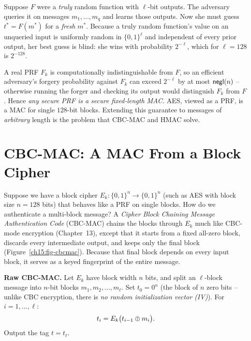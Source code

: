 \begin{whybox}
Suppose $F$ were a \emph{truly} random function with $\ell$-bit outputs. The adversary queries it on messages $m_1,\dots,m_q$ and learns those outputs. Now she must guess $t^* = F(m^*)$ for a \emph{fresh} $m^*$. Because a truly random function's value on an unqueried input is uniformly random in $\{0,1\}^\ell$ and independent of every prior output, her best guess is blind: she wins with probability $2^{-\ell}$, which for $\ell = 128$ is $2^{-128}$.

A real PRF $F_k$ is computationally indistinguishable from $F$, so an efficient adversary's forgery probability against $F_k$ can exceed $2^{-\ell}$ by at most $\mathsf{negl}(n)$ -- otherwise running the forger and checking its output would distinguish $F_k$ from $F$. Hence \emph{any secure PRF is a secure fixed-length MAC.} AES, viewed as a PRF, is a MAC for single $128$-bit blocks. Extending this guarantee to messages of \emph{arbitrary} length is the problem that CBC-MAC and HMAC solve.
\end{whybox}

\section{CBC-MAC: A MAC From a Block Cipher}
\label{ch15:cbc-mac}

Suppose we have a block cipher $E_k : \{0,1\}^n \to \{0,1\}^n$ (such as AES with block size $n = 128$ bits) that behaves like a PRF on single blocks. How do we authenticate a multi-block message? A \emph{Cipher Block Chaining Message Authentication Code} (CBC-MAC) chains the blocks through $E_k$ much like CBC-mode encryption (Chapter~13), except that it starts from a fixed all-zero block, discards every intermediate output, and keeps only the final block (Figure~\ref{ch15:fig-cbcmac}). Because that final block depends on every input block, it serves as a keyed fingerprint of the entire message.

\begin{focusbox}
\textbf{Raw CBC-MAC.} Let $E_k$ have block width $n$ bits, and split an $\ell$-block message into $n$-bit blocks $m_1,m_2,\dots,m_\ell$. Set $t_0 = 0^n$ (the block of $n$ zero bits -- unlike CBC encryption, there is \emph{no random initialization vector (IV)}). For $i=1,\dots,\ell$:
\[
  t_i = E_k\bigl(t_{i-1}\oplus m_i\bigr).
\]
Output the tag $t = t_\ell$.
\end{focusbox}

